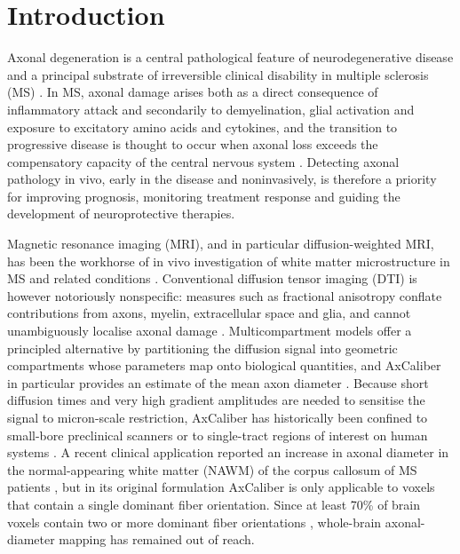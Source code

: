 \section{Introduction}

Axonal degeneration is a central pathological feature of neurodegenerative disease and a principal substrate of irreversible clinical disability in multiple sclerosis (MS) \cite{criste2014axonal,haines2011axonal}. In MS, axonal damage arises both as a direct consequence of inflammatory attack and secondarily to demyelination, glial activation and exposure to excitatory amino acids and cytokines, and the transition to progressive disease is thought to occur when axonal loss exceeds the compensatory capacity of the central nervous system \cite{criste2014axonal}. Detecting axonal pathology in vivo, early in the disease and noninvasively, is therefore a priority for improving prognosis, monitoring treatment response and guiding the development of neuroprotective therapies.

Magnetic resonance imaging (MRI), and in particular diffusion-weighted MRI, has been the workhorse of in vivo investigation of white matter microstructure in MS and related conditions \cite{inglese2010diffusion}. Conventional diffusion tensor imaging (DTI) is however notoriously nonspecific: measures such as fractional anisotropy conflate contributions from axons, myelin, extracellular space and glia, and cannot unambiguously localise axonal damage \cite{desantis2014accuracy}. Multicompartment models offer a principled alternative by partitioning the diffusion signal into geometric compartments whose parameters map onto biological quantities, and AxCaliber in particular provides an estimate of the mean axon diameter \cite{assaf2008axcaliber,alexander2010orientationally,sepehrband2016towards}. Because short diffusion times and very high gradient amplitudes are needed to sensitise the signal to micron-scale restriction, AxCaliber has historically been confined to small-bore preclinical scanners or to single-tract regions of interest on human systems \cite{jones2018microstructural,barazany2009invivo}. A recent clinical application reported an increase in axonal diameter in the normal-appearing white matter (NAWM) of the corpus callosum of MS patients \cite{desantis2019whole}, but in its original formulation AxCaliber is only applicable to voxels that contain a single dominant fiber orientation. Since at least 70\% of brain voxels contain two or more dominant fiber orientations \cite{jeurissen2013investigating}, whole-brain axonal-diameter mapping has remained out of reach.

